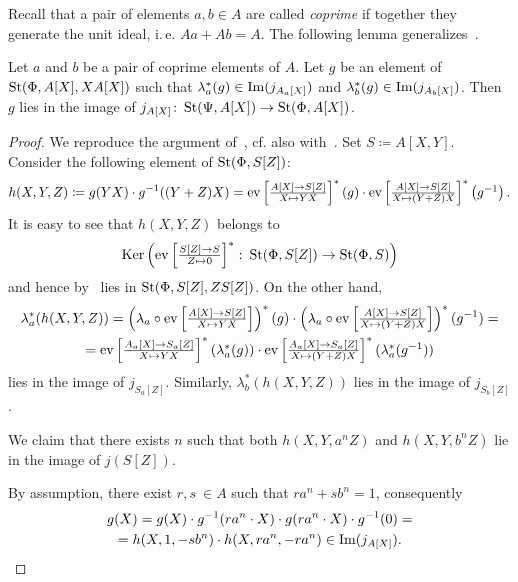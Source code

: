 Recall that a pair of elements $a, b \in A$ are called \textit{coprime} if together they generate the unit ideal, i.\,e. $Aa + Ab = A$.
The following lemma generalizes~\cite[Lemma~2.5]{Tu83}.
\begin{lemma}\label{lem:L25-2}
Let $a$ and $b$ be a pair of coprime elements of $A$.
Let $g$ be an element of $\St(\Phi, A[X], XA[X])$ such that
$\lambda_a^*(g) \in \Img(j_{A_a[X]})$ and $\lambda_b^*(g) \in \Img(j_{A_b[X]})$.
Then $g$ lies in the image of $j_{A[X]} \colon \St(\Psi, A[X]) \to \St(\Phi, A[X])$.
\end{lemma}
\begin{proof}
    We reproduce the argument of~\cite[Lemma~2.5]{Tu83}, cf. also with~\cite[Lemma~16]{S15}.
    Set $S \coloneqq A[X, Y]$.
    Consider the following element of $\St(\Phi, S[Z])$:
    \[h(X, Y, Z) \coloneqq g(YX) \cdot  g^{-1}((Y+Z) X) = \ev{A}{S[Z]}{YX}^* \left(g\right) \cdot \ev{A}{S[Z]}{(Y + Z)X}^*\left(g^{-1}\right).\]
    It is easy to see that $h(X, Y, Z)$ belongs to
    \[\Ker\left(\eval{Z}{S}{S}{0}^*\colon\St(\Phi, S[Z]) \rightarrow \St(\Phi, S)\right)\]
    and hence by~\cite[Lemma~8]{S15} lies in $\St(\Phi, S[Z], Z S[Z])$.
    On the other hand, \begin{multline*}
                           \lambda_{a}^*(h(X, Y, Z)) = \left(\lambda_a\circ \ev{A}{S[Z]}{Y X}\right)^*(g) \cdot \left(\lambda_a\circ \ev{A}{S[Z]}{(Y + Z)X}\right)^*(g^{-1}) = \\
                           = \ev{A_a}{S_a[Z]}{YX}^*(\lambda_{a}^*(g)) \cdot \ev{A_a}{S_a[Z]}{(Y + Z)X}^*(\lambda_{a}^*(g^{-1})) \end{multline*}
    lies in the image of $j_{S_a[Z]}$.
    Similarly, $\lambda_{b}^*(h(X, Y, Z))$ lies in the image of $j_{S_b[Z]}$.

    We claim that there exists $n$ such that both $h(X, Y, a^n Z)$ and $h(X, Y, b^n Z)$
    lie in the image of $j(S[Z])$.

    By assumption, there exist $r, s\ \in A$ such that $r a^n + s b^n = 1$, consequently
    \begin{multline*}
        g(X) = g(X)\cdot g^{-1}(ra^n\cdot X) \cdot g(ra^n\cdot X) \cdot g^{-1}(0) = \\
         = h(X, 1, -sb^n) \cdot h(X, ra^n, -ra^n) \in \mathrm{Im}(j_{A[X]}). \qedhere
    \end{multline*} \end{proof}

